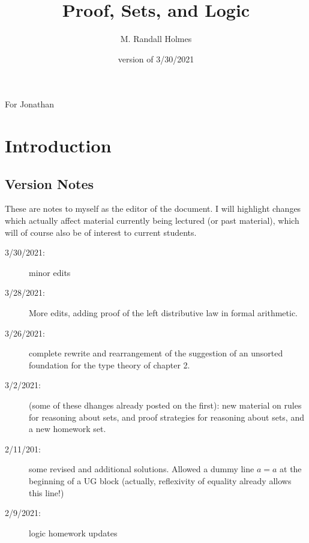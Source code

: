 \documentclass[12pt]{book}
\title{Proof, Sets, and Logic}
\author{M. Randall Holmes}
\date{version of 3/30/2021}
\begin{document}
\maketitle

\newpage

\begin{centering}
For Jonathan\\
\end{centering}

\newpage

\tableofcontents

\newpage

\section{Introduction}

{\tiny

\subsection{Version Notes}

These are notes to myself as the editor of the document.  I will
highlight changes which actually affect material currently being
lectured (or past material), which will of course also be of interest
to current students.

\begin{description}

\item[3/30/2021:]  minor edits

\item[3/28/2021:]  More edits, adding proof of the left distributive law in formal arithmetic.

\item[3/26/2021:]  complete rewrite and rearrangement of the suggestion of an unsorted foundation for the type theory of chapter 2.

\item[3/2/2021:]  (some of these dhanges already posted on the first):  new material on rules for reasoning about sets, and proof strategies for reasoning about sets, and a new homework set.

\item[2/11/201:]  some revised and additional solutions.  Allowed a dummy line $a=a$ at the beginning of a UG block (actually, reflexivity of equality already allows this line!)

\item[2/9/2021:]  logic homework updates


\end{description}}
\end{document}
